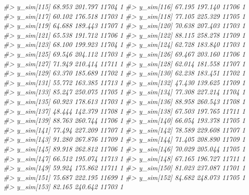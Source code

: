 \documentclass[
  10pt,
  italian,
  a4paper,
  extrafontsizes,onecolumn,openright
  ]{memoir}
\newenvironment{Shaded}{\begin{snugshade}}{\end{snugshade}}
\newcommand{\CommentTok}[1]{\textcolor[rgb]{0.56,0.35,0.01}{\textit{#1}}}
\begin{document}
\begin{Shaded}
\begin{Highlighting}[]
\CommentTok{\#\textgreater{} y\_sim[115] 68.953 201.797 11704    1}
\CommentTok{\#\textgreater{} y\_sim[116] 67.195 197.140 11706    1}
\CommentTok{\#\textgreater{} y\_sim[117] 60.102 176.518 11703    1}
\CommentTok{\#\textgreater{} y\_sim[118] 77.105 225.329 11705    1}
\CommentTok{\#\textgreater{} y\_sim[119] 64.688 189.443 11707    1}
\CommentTok{\#\textgreater{} y\_sim[120] 70.638 207.403 11703    1}
\CommentTok{\#\textgreater{} y\_sim[121] 65.538 191.712 11706    1}
\CommentTok{\#\textgreater{} y\_sim[122] 88.115 258.278 11709    1}
\CommentTok{\#\textgreater{} y\_sim[123] 68.100 199.923 11704    1}
\CommentTok{\#\textgreater{} y\_sim[124] 62.728 183.840 11703    1}
\CommentTok{\#\textgreater{} y\_sim[125] 69.546 204.112 11703    1}
\CommentTok{\#\textgreater{} y\_sim[126] 69.467 203.160 11706    1}
\CommentTok{\#\textgreater{} y\_sim[127] 71.949 210.414 11711    1}
\CommentTok{\#\textgreater{} y\_sim[128] 62.014 181.558 11707    1}
\CommentTok{\#\textgreater{} y\_sim[129] 63.370 185.689 11702    1}
\CommentTok{\#\textgreater{} y\_sim[130] 62.238 183.451 11702    1}
\CommentTok{\#\textgreater{} y\_sim[131] 55.772 163.385 11713    1}
\CommentTok{\#\textgreater{} y\_sim[132] 47.430 139.625 11709    1}
\CommentTok{\#\textgreater{} y\_sim[133] 85.247 250.075 11705    1}
\CommentTok{\#\textgreater{} y\_sim[134] 77.308 227.214 11704    1}
\CommentTok{\#\textgreater{} y\_sim[135] 60.923 178.613 11703    1}
\CommentTok{\#\textgreater{} y\_sim[136] 88.958 260.543 11708    1}
\CommentTok{\#\textgreater{} y\_sim[137] 48.444 142.379 11708    1}
\CommentTok{\#\textgreater{} y\_sim[138] 67.503 197.765 11711    1}
\CommentTok{\#\textgreater{} y\_sim[139] 88.763 260.744 11706    1}
\CommentTok{\#\textgreater{} y\_sim[140] 66.054 193.378 11705    1}
\CommentTok{\#\textgreater{} y\_sim[141] 77.494 227.209 11707    1}
\CommentTok{\#\textgreater{} y\_sim[142] 78.589 229.608 11707    1}
\CommentTok{\#\textgreater{} y\_sim[143] 91.280 267.876 11709    1}
\CommentTok{\#\textgreater{} y\_sim[144] 71.405 208.890 11709    1}
\CommentTok{\#\textgreater{} y\_sim[145] 89.918 262.812 11706    1}
\CommentTok{\#\textgreater{} y\_sim[146] 70.029 205.044 11705    1}
\CommentTok{\#\textgreater{} y\_sim[147] 66.512 195.074 11713    1}
\CommentTok{\#\textgreater{} y\_sim[148] 67.165 196.727 11711    1}
\CommentTok{\#\textgreater{} y\_sim[149] 59.924 175.862 11711    1}
\CommentTok{\#\textgreater{} y\_sim[150] 81.023 237.087 11701    1}
\CommentTok{\#\textgreater{} y\_sim[151] 75.687 222.195 11699    1}
\CommentTok{\#\textgreater{} y\_sim[152] 84.682 248.073 11705    1}
\CommentTok{\#\textgreater{} y\_sim[153] 82.165 240.642 11703    1}

\end{Highlighting}
\end{Shaded}
\end{document}
